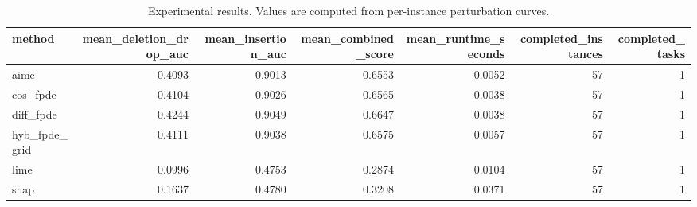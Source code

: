 \begin{table}[t]
\caption{Experimental results. Values are computed from per-instance perturbation curves.}
\label{tab:main_results_computed}
\centering
\begin{tabular}{lrrrrrr}
\toprule
method & mean\_deletion\_drop\_auc & mean\_insertion\_auc & mean\_combined\_score & mean\_runtime\_seconds & completed\_instances & completed\_tasks \\
\midrule
aime & 0.4093 & 0.9013 & 0.6553 & 0.0052 & 57 & 1 \\
cos\_fpde & 0.4104 & 0.9026 & 0.6565 & 0.0038 & 57 & 1 \\
diff\_fpde & 0.4244 & 0.9049 & 0.6647 & 0.0038 & 57 & 1 \\
hyb\_fpde\_grid & 0.4111 & 0.9038 & 0.6575 & 0.0057 & 57 & 1 \\
lime & 0.0996 & 0.4753 & 0.2874 & 0.0104 & 57 & 1 \\
shap & 0.1637 & 0.4780 & 0.3208 & 0.0371 & 57 & 1 \\
\bottomrule
\end{tabular}

\end{table}
